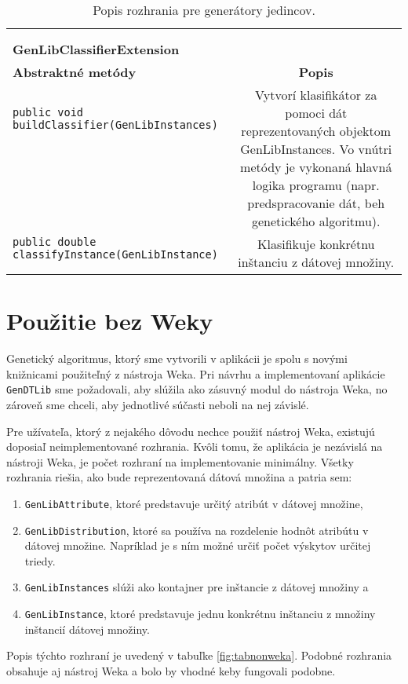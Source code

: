 \begin{table}
\begin{tabular}{|l|c|}
& \\ 
& \\ 
\hline
\hline
\textbf{GenLibClassifierExtension} & \\
\hline\hline
\textbf{Abstraktné metódy} & \textbf{Popis} \\
\hline
\verb|public void buildClassifier(GenLibInstances)| & \multirow{8}{5cm}{Vytvorí klasifikátor za pomoci dát reprezentovaných objektom GenLibInstances. Vo vnútri metódy je vykonaná hlavná logika programu (napr. predspracovanie dát, beh genetického algoritmu).} \\
& \\
& \\
& \\ 
& \\ 
& \\ 
& \\ 
& \\ 
\hline
\verb|public double classifyInstance(GenLibInstance)| & \multirow{3}{5cm}{Klasifikuje konkrétnu inštanciu z dátovej množiny.} \\
& \\ 
& \\ 
\hline
\hline
\end{tabular}
\caption{Popis rozhrania pre generátory jedincov.}\label{fig:tabclass}
\end{table}
\section{Použitie bez Weky}
Genetický algoritmus, ktorý sme vytvorili v aplikácii je spolu s novými knižnicami použiteľný z nástroja Weka. Pri návrhu a implementovaní aplikácie \verb|GenDTLib| sme požadovali, aby slúžila ako zásuvný modul do nástroja Weka, no zároveň sme chceli, aby jednotlivé súčasti neboli na nej závislé. 

Pre užívateľa, ktorý z nejakého dôvodu nechce použiť nástroj Weka, existujú doposiaľ neimplementované rozhrania. Kvôli tomu, že aplikácia je nezávislá na nástroji Weka, je počet rozhraní na implementovanie minimálny. Všetky rozhrania riešia, ako bude reprezentovaná dátová množina a patria sem:
\begin{enumerate}
\item \verb|GenLibAttribute|, ktoré predstavuje určitý atribút v dátovej množine,
\item \verb|GenLibDistribution|, ktoré sa používa na rozdelenie hodnôt atribútu v dátovej množine. Napríklad je s ním možné určiť počet výskytov určitej triedy.
\item \verb|GenLibInstances| slúži ako kontajner pre inštancie z dátovej množiny a
\item \verb|GenLibInstance|, ktoré predstavuje jednu konkrétnu inštanciu z množiny inštancií dátovej množiny.
\end{enumerate}
Popis týchto rozhraní je uvedený v tabuľke \ref{fig:tabnonweka}. Podobné rozhrania obsahuje aj nástroj Weka a bolo by vhodné keby fungovali podobne.

